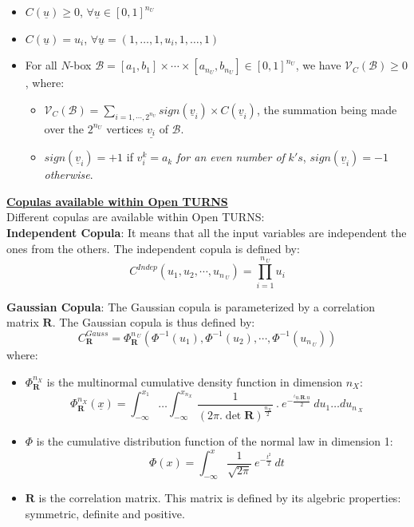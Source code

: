 {  \begin{itemize}
  \item $C(\underline{u}) \geq 0$,  $\forall \underline{u} \in [0,1]^{n_U}$
  \item $C(\underline{u}) = u_i$, $\forall \underline{u}=(1,\ldots,1,u_i,1,\ldots,1)$
  \item For all $N$-box $\mathcal B = [a_1,b_1] \times \cdots \times [a_{n_U},b_{n_U}] \in [0,1]^{n_U}$, we have $\mathcal V_C(\mathcal B) \geq 0$,     where:
    \begin{itemize}
    \item       $\mathcal V_C(\mathcal B) = \sum_{i=1,\cdots, 2^{n_U}} sign(\underline{v}_i) \times C(\underline{v}_i)$, the summation being made over the $2^{n_U}$ vertices $\underline{v_i}$ of $\mathcal B$.
    \item       $sign(\underline{v}_i)= +1$ if $v_i^k = a_k$ \textit{for an even number of} $k's$, $sign(\underline{v}_i)= -1$ \textit{otherwise}.\\
    \end{itemize}
  \end{itemize}

  \underline{\textbf{Copulas available within Open TURNS}}\\

  Different copulas are available within Open TURNS:\\

  {\bf Independent Copula}: It means that all the input variables are independent the ones from the others. The independent copula is defined by:
  $$
  C^{Indep}(u_1,u_2,\cdots,u_{n_{\:U}}) = \prod_{i=1}^{n_{\:U}} u_i
  $$

  {\bf Gaussian Copula}: The Gaussian copula is parameterized by a correlation matrix $\mathbf R$. The Gaussian copula is thus defined by:
  $$
  C^{Gauss}_{\mathbf R} = \Phi_{\mathbf R}^{n_{\:U}}\left(\Phi^{-1}(u_1),\Phi^{-1}(u_2),\cdots,\Phi^{-1}(u_{n_{\:U}}) \right)
  $$
  where:
  \begin{itemize}
  \item $\Phi_{\mathbf R}^{n_{X}}$ is the multinormal cumulative density function in dimension ${n_{X}}$:
    $$
    \Phi_{\mathbf R}^{n_{X}}(\underline{x}) =  \int_{-\infty}^{x_1} \ldots \int_{-\infty}^{x_{n_{X}}} \frac{1}{{(2\pi.\det{\mathbf R})}^{\frac{n_{X}}{2}}} \: . \: e^{-\frac{^t\underline{u}.\mathbf R.\underline{u}}{2}} \: du_1\ldots du_{n_{\:X}}
    $$
  \item $\Phi$ is the cumulative distribution function of the normal law in dimension 1:
    $$
    \Phi(x) = \int_{-\infty}^x \frac{1}{\sqrt{2\pi}} \: e^{-\frac{t^2}{2}} \: dt
    $$
  \item $\mathbf R$ is the correlation matrix. This matrix is defined by its algebric properties: symmetric, definite and positive. \\
  \end{itemize}


}
